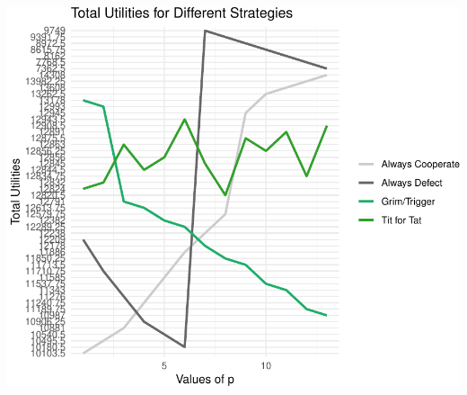 \documentclass[11pt,preprint]{elsarticle}
\let\origfigure\figure
\let\endorigfigure\endfigure
\renewenvironment{figure}[1][2] {
    \expandafter\origfigure\expandafter[H]
} {
    \endorigfigure
}
\numberwithin{equation}{section}
\numberwithin{figure}{section}
\numberwithin{table}{section}
\begin{document}
\begin{figure}[H]

{\centering \includegraphics{Prisoners-Dilemma_files/figure-latex/unnamed-chunk-7-1} 

}

\caption{Strategy Ranks Across Different Values of p\label{pvalues}}\label{fig:unnamed-chunk-7}
\end{figure}
\end{document}
